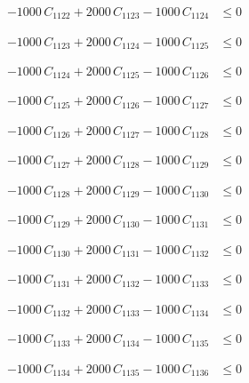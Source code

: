 \documentclass[a4paper,11pt]{article}
\begin{document}
\begin{align}
-1000\,C_{1122} + 2000\,C_{1123} - 1000\,C_{1124} &\leq 0 \nonumber
\end{align}

\begin{align}
-1000\,C_{1123} + 2000\,C_{1124} - 1000\,C_{1125} &\leq 0 \nonumber
\end{align}

\begin{align}
-1000\,C_{1124} + 2000\,C_{1125} - 1000\,C_{1126} &\leq 0 \nonumber
\end{align}

\begin{align}
-1000\,C_{1125} + 2000\,C_{1126} - 1000\,C_{1127} &\leq 0 \nonumber
\end{align}

\begin{align}
-1000\,C_{1126} + 2000\,C_{1127} - 1000\,C_{1128} &\leq 0 \nonumber
\end{align}

\begin{align}
-1000\,C_{1127} + 2000\,C_{1128} - 1000\,C_{1129} &\leq 0 \nonumber
\end{align}

\begin{align}
-1000\,C_{1128} + 2000\,C_{1129} - 1000\,C_{1130} &\leq 0 \nonumber
\end{align}

\begin{align}
-1000\,C_{1129} + 2000\,C_{1130} - 1000\,C_{1131} &\leq 0 \nonumber
\end{align}

\begin{align}
-1000\,C_{1130} + 2000\,C_{1131} - 1000\,C_{1132} &\leq 0 \nonumber
\end{align}

\begin{align}
-1000\,C_{1131} + 2000\,C_{1132} - 1000\,C_{1133} &\leq 0 \nonumber
\end{align}

\begin{align}
-1000\,C_{1132} + 2000\,C_{1133} - 1000\,C_{1134} &\leq 0 \nonumber
\end{align}

\begin{align}
-1000\,C_{1133} + 2000\,C_{1134} - 1000\,C_{1135} &\leq 0 \nonumber
\end{align}

\begin{align}
-1000\,C_{1134} + 2000\,C_{1135} - 1000\,C_{1136} &\leq 0 \nonumber
\end{align}
\end{document}
